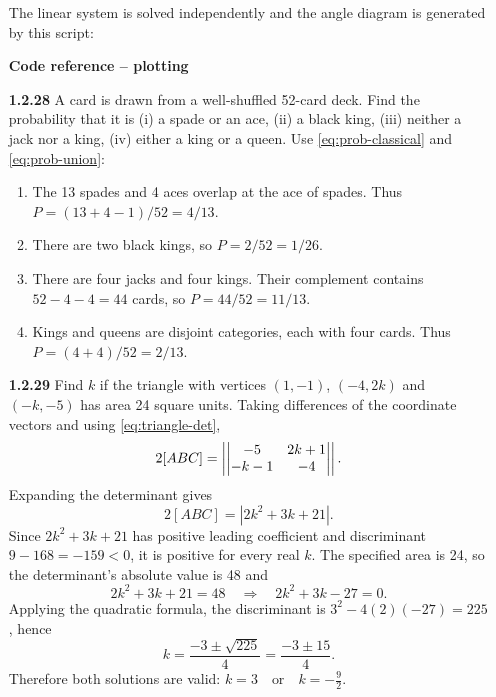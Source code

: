 \begin{enumerate}[label={},leftmargin=0pt,itemsep=9pt]
The linear system is solved independently and the angle diagram is generated by this script:
\par\smallskip
\noindent\textbf{Code reference -- plotting}
\par\noindent{}
\par\smallskip
\setcounter{qcurrent}{28}\setcounter{equation}{0}
\item[\textbf{1.2.28}] A card is drawn from a well-shuffled 52-card deck. Find the probability that it is (i) a spade or an ace, (ii) a black king, (iii) neither a jack nor a king, (iv) either a king or a queen.
\solution Use \eqref{eq:prob-classical} and \eqref{eq:prob-union}:
\begin{enumerate}[label=(\roman*)]
\item The 13 spades and 4 aces overlap at the ace of spades. Thus $P=(13+4-1)/52=4/13$.
\item There are two black kings, so $P=2/52=1/26$.
\item There are four jacks and four kings. Their complement contains $52-4-4=44$ cards, so $P=44/52=11/13$.
\item Kings and queens are disjoint categories, each with four cards. Thus $P=(4+4)/52=2/13$.
\end{enumerate}

\setcounter{qcurrent}{29}\setcounter{equation}{0}
\item[\textbf{1.2.29}] Find $k$ if the triangle with vertices $(1,-1)$, $(-4,2k)$ and $(-k,-5)$ has area 24 square units.
\solution Taking differences of the coordinate vectors and using \eqref{eq:triangle-det},
\begin{equation}
2[ABC]=\left|\begin{vmatrix}-5&2k+1\\-k-1&-4\end{vmatrix}\right|.
\end{equation}
Expanding the determinant gives
\begin{equation}
2[ABC]=|2k^2+3k+21|.
\end{equation}
Since $2k^2+3k+21$ has positive leading coefficient and discriminant $9-168=-159<0$, it is positive for every real $k$. The specified area is 24, so the determinant's absolute value is 48 and
\begin{equation}
2k^2+3k+21=48\quad\Longrightarrow\quad2k^2+3k-27=0.
\end{equation}
Applying the quadratic formula, the discriminant is $3^2-4(2)(-27)=225$, hence
\begin{equation}
k=\frac{-3\pm\sqrt{225}}4=\frac{-3\pm15}4.
\end{equation}
Therefore both solutions are valid: $k=3\quad\text{or}\quad k=-\frac92$.




\end{enumerate}
